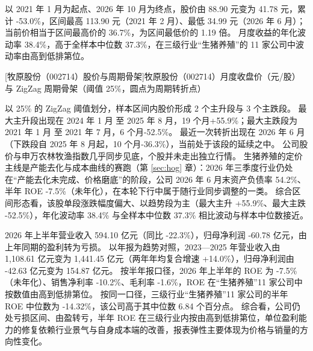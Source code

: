  以 2021 年 1 月为起点、2026 年 10 月为终点，股价由 88.90 元变为 41.78 元，累计 -53.0\%，区间最高 113.90 元（2021 年 2 月）、最低 34.99 元（2026 年 6 月）；当前价相当于区间最高价的 36.7\%，为区间最低价的 1.19 倍。 月度收益的年化波动率 38.4\%，高于全样本中位数 37.3\%，在三级行业“生猪养殖”的 11 家公司中波动率由高到低排第位。

\begin{center}
\begin{minipage}{\textwidth}\centering
{}

[牧原股份（002714）股价与周期骨架]{牧原股份（002714）月度收盘价（元/股）与 ZigZag 周期骨架（阈值 25\%，圆点为周期转折点）}
\end{minipage}
\end{center}

 以 25\% 的 ZigZag 阈值划分，样本区间内股价形成 2 个主升段与 3 个主跌段。 最大主升段出现在 2024 年 1 月 至 2025 年 8 月，19 个月+55.9\%；最大主跌段为 2021 年 1 月 至 2021 年 7 月，6 个月-52.5\%。 最近一次转折出现在 2026 年 6 月（下跌段自 2025 年 8 月起，10 个月-36.3\%），当前处于该段的延续之中。 公司股价与申万农林牧渔指数几乎同步见底，个股并未走出独立行情。 生猪养殖的定价主线是产能去化与成本曲线的赛跑（第 \ref{sec:hog} 章）：2026 年三季度行业仍处在“产能去化未完成、价格磨底”的阶段，公司 2026 年 6 月末资产负债率 54.2\%、半年 ROE -7.5\%（未年化），在本轮下行中属于随行业同步调整的一类。 综合区间形态看，该股单段涨跌幅度偏大、以趋势段为主（最大主升 +55.9\%、最大主跌 -52.5\%），年化波动率 38.4\% 与全样本中位数 37.3\% 相比波动与样本中位数接近。

 2026 年上半年营业收入 594.10 亿元（同比 -22.3\%），归母净利润 -60.78 亿元，由上年同期的盈利转为亏损。 以年报为趋势对照，2023---2025 年营业收入由 1,108.61 亿元变为 1,441.45 亿元（两年年均复合增速 +14.0\%），归母净利润由 -42.63 亿元变为 154.87 亿元。 按半年报口径，2026 年上半年的 ROE 为 -7.5\%（未年化）、销售净利率 -10.2\%、毛利率 -1.6\%，ROE 在“生猪养殖”11 家公司中按数值由高到低排第位。 按同一口径，三级行业“生猪养殖”11 家公司的半年 ROE 中位数为 -14.32\%，该公司高于其中位数 6.84 个百分点。 综合看，公司仍处亏损区间、由盈转亏，半年 ROE 在三级行业内按由高到低排第位，单位盈利能力的修复依赖行业景气与自身成本端的改善，报表弹性主要体现为价格与销量的方向性变化。


